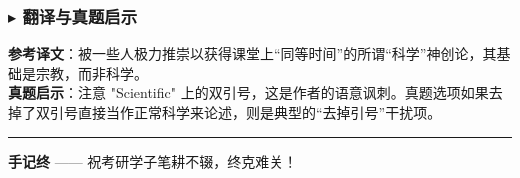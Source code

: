 \documentclass[cn,normal,11pt]{elegantnote}
\newcommand{\tips}[1]{{\color{ecolor}\textbf{#1}}}
\begin{document}
\subsubsection*{$\blacktriangleright$ 翻译与真题启示}
\begin{remark}
  \textbf{参考译文}：被一些人极力推崇以获得课堂上“同等时间”的所谓“科学”神创论，其基础是宗教，而非科学。\\
  \textbf{真题启示}：注意 "Scientific" 上的双引号，这是作者的语意讽刺。真题选项如果去掉了双引号直接当作正常科学来论述，则是典型的“去掉引号”干扰项。
\end{remark}

\vspace{10pt}
\hrule
\vspace{5pt}

\begin{center}
  \footnotesize \tips{手记终} —— 祝考研学子笔耕不辍，终克难关！
\end{center}
\end{document}
